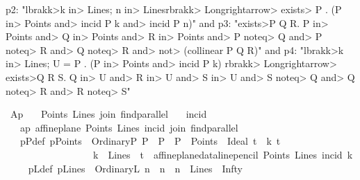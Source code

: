 \begin{isabellebody}
\begin{isamarkuptext}
    p2: "\<lbrakk>k \<in> Lines; n \<in> Lines\<rbrakk> \<Longrightarrow> \<exists> P . (P \<in> Points \<and> incid P k \<and> incid P n)" and
    p3: "\<exists>P Q R. P \<in> Points \<and> Q \<in> Points \<and> R \<in> Points \<and> P \<noteq> Q \<and> P \<noteq> R \<and> Q \<noteq> R \<and> \<not> (collinear P Q R)" and
    p4: "\<lbrakk>k \<in> Lines; U = { P . (P \<in> Points \<and> incid P k)} \<rbrakk> \<Longrightarrow> \<exists>Q R S. Q \<in> U \<and> R \<in> U \<and> S \<in> U \<and> S \<noteq> Q \<and> Q \<noteq> R \<and> R \<noteq> S"%
\end{isamarkuptext}\isamarkuptrue%
\isamarkupfalse%
\ Ap{}{\isacharcolon}{\kern0pt}\isanewline
\ \ \ Points\ Lines\ join\ find{\isacharunderscore}{\kern0pt}parallel\isanewline
\ \ \ incid\ {\isacharparenleft}{\kern0pt}\ {\isachardoublequoteopen}{\isasymlhd}{\isachardoublequoteclose}\ {}{}{\isacharparenright}{\kern0pt}\isanewline
\ \ \ ap{\isacharcolon}{\kern0pt}\ {\isachardoublequoteopen}affine{\isacharunderscore}{\kern0pt}plane\ Points\ Lines\ incid\ join\ find{\isacharunderscore}{\kern0pt}parallel{\isachardoublequoteclose}\isanewline
\ \ \ pPdef{\isacharcolon}{\kern0pt}\ {\isachardoublequoteopen}pPoints\ {\isasymequiv}\ {\isacharbraceleft}{\kern0pt}OrdinaryP\ P\ {\isacharbar}{\kern0pt}\ P\ {\isachardot}{\kern0pt}\ {\isacharparenleft}{\kern0pt}P\ {\isasymin}\ Points{\isacharparenright}{\kern0pt}{\isacharbraceright}{\kern0pt}\ {\isasymunion}\ {\isacharbraceleft}{\kern0pt}Ideal\ t\ {\isacharbar}{\kern0pt}\ k\ t\ {\isachardot}{\kern0pt}\ \isanewline
\ \ \ \ \ \ \ \ \ \ \ \ \ \ \ \ \ \ {\isacharparenleft}{\kern0pt}{\isacharparenleft}{\kern0pt}k\ {\isasymin}\ Lines{\isacharparenright}{\kern0pt}\ {\isasymand}\ {\isacharparenleft}{\kern0pt}t\ {\isacharequal}{\kern0pt}\ affine{\isacharunderscore}{\kern0pt}plane{\isacharunderscore}{\kern0pt}data{\isachardot}{\kern0pt}line{\isacharunderscore}{\kern0pt}pencil\ Points\ Lines\ {\isacharparenleft}{\kern0pt}incid{\isacharparenright}{\kern0pt}\ k{\isacharparenright}{\kern0pt}\ {\isacharparenright}{\kern0pt}{\isacharbraceright}{\kern0pt}{\isachardoublequoteclose}\isanewline
\ \ \ pLdef{\isacharcolon}{\kern0pt}\ {\isachardoublequoteopen}pLines\ {\isasymequiv}\ {\isacharbraceleft}{\kern0pt}OrdinaryL\ n\ {\isacharbar}{\kern0pt}\ n\ {\isachardot}{\kern0pt}\ {\isacharparenleft}{\kern0pt}n\ {\isasymin}\ Lines{\isacharparenright}{\kern0pt}{\isacharbraceright}{\kern0pt}\ {\isasymunion}\ {\isacharbraceleft}{\kern0pt}Infty{\isacharbraceright}{\kern0pt}{\isachardoublequoteclose}\isanewline

\end{isabellebody}

